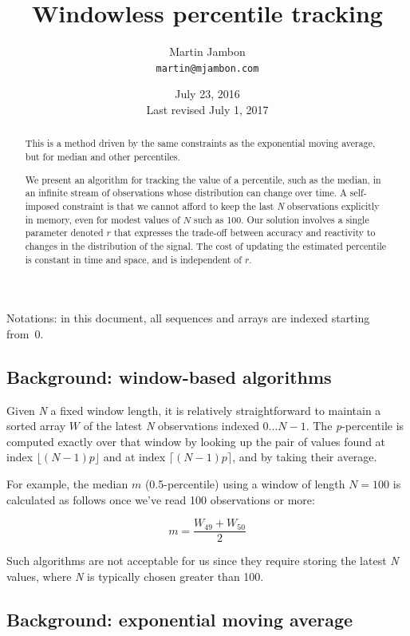 \documentclass[]{article}
\title{Windowless percentile tracking}
\author{Martin Jambon\\
        \texttt{martin@mjambon.com}}
\date{July 23, 2016\\
Last revised July 1, 2017}
\begin{document}
\maketitle

\begin{abstract}
This is a method driven by the same constraints as the exponential
moving average, but for median and other percentiles.

We present an algorithm for tracking the value of a percentile, such as
the median, in an infinite stream of observations whose distribution can
change over time. A self-imposed constraint is that we cannot afford to
keep the last \emph{N} observations explicitly in memory, even for
modest values of $N$ such as 100.
Our solution involves a single parameter denoted \(r\)
that expresses the trade-off between accuracy and reactivity
to changes in the distribution of the signal.
The cost of updating the estimated percentile is constant in
time and space, and is independent of $r$.
\end{abstract}

Notations: in this document, all sequences and arrays are indexed
starting from~0.

\subsection{Background: window-based
algorithms}\label{background-window-based-algorithms}

Given \emph{N} a fixed window length, it is relatively straightforward
to maintain a sorted array \(W\) of the latest \emph{N} observations
indexed \(0\dots N-1\). The \emph{p}-percentile is computed exactly over
that window by looking up the pair of values found at index
\(\lfloor (N-1)p \rfloor\) and at index \(\lceil (N-1)p \rceil\), and by
taking their average.

For example, the median \(m\) (0.5-percentile) using a window of length
\(N=100\) is calculated as follows once we've read 100 observations or
more:

\[m = \frac{W_{49} + W_{50}}{2}\]

Such algorithms are not acceptable for us since they require storing the
latest \emph{N} values, where \emph{N} is typically chosen greater than
100.

\subsection{Background: exponential moving
average}\label{background-exponential-moving-average}
\end{document}
